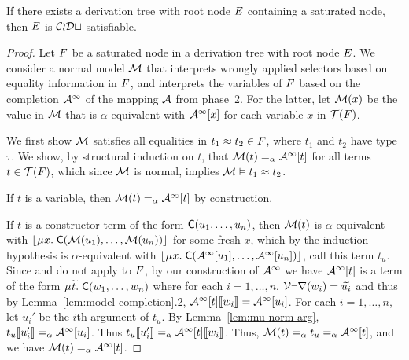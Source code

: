 \begin{theorem}%
\label{thm:ss}%
\afterDot
If there exists a derivation tree with root node $E$ containing a saturated node, then $E$ is $\mathcal{CoDt}$-satisfiable.
\end{theorem}
\begin{proof}
Let $F$ be a saturated node in a derivation tree with root node $E$.
We consider a normal model $\mathcal{M}$
that interprets wrongly applied selectors based on equality information in $F$,
and interprets the variables of $F$ based on the completion $\mathcal{A}^\infty$ of the mapping $\mathcal{A}$ from phase~2.
For the latter, let $\mathcal{M}( x )$ be the value in $\mathcal{M}$ that is $\alpha$-equivalent with $\mathcal{A}^\infty [x]$ for each variable $x$ in $\mathcal{T}(F)$.

We first show $\mathcal{M}$ satisfies all equalities in $t_1 \approx t_2 \in F$, where $t_1$ and $t_2$ have type $\tau$.
We show,
by structural induction on $t$,
that $\mathcal{M}( t ) \mathrel{=_\alpha} \mathcal{A}^\infty [t]$ for all terms $t \in \mathcal{T}( F )$,
which since $\mathcal{M}$ is normal, implies $\mathcal{M} \vDash t_1 \approx t_2$.

If $t$ is a variable, then $\mathcal{M}( t ) \mathrel{=_\alpha} \mathcal{A}^\infty [ t ]$ by construction.

If $t$ is a constructor term of the form $\textsf{C}( u_1, \ldots, u_n )$,
then $\mathcal{M}( t )$ is $\alpha$-equivalent with $\nf{\MU x.\; \const{C}( \M( u_1 ), \ldots, \M( u_n ) ) }$ for some fresh $x$,
which by the induction hypothesis is $\alpha$-equivalent with $\nf{\MU x.\; \const{C}( \Val^\AST \ec{ u_1 }, \ldots, \Val^\AST \ec{ u_n } )}$, call this term $t_u$.
Since  and  do not apply to $F$, 
by our construction of $\mathcal{A}^\infty$ we have $\mathcal{A}^\infty [t]$ is a term
of the form $\MU {\Varec{t}}.\; \const{C}( w_1, \ldots, w_n )$ 
where for each $i = 1, \ldots, n$, 
$\mathcal{Var}(w_i) = {\widetilde{u_i}}$ and thus by Lemma~\ref{lem:model-completion}.2, 
$\mathcal{A}^\infty [t]\llbracket w_i \rrbracket = \mathcal{A}^\infty [u_i]$.
For each $i = 1, \ldots, n$, let $u_i'$ be the $i$\vvthinspace th argument of $t_u$.
By Lemma~\ref{lem:mu-norm-arg}, $t_u\llbracket u_i' \rrbracket \mathrel{=_\alpha} \mathcal{A}^\infty [u_i]$.
Thus $t_u\llbracket u_i' \rrbracket \mathrel{=_\alpha} \mathcal{A}^\infty [t]\llbracket  w_i  \rrbracket$. %
Thus, $\mathcal{M}( t ) \mathrel{=_\alpha} t_u \mathrel{=_\alpha} \mathcal{A}^\infty [t]$, and
we have $\mathcal{M}( t ) \mathrel{=_\alpha} \mathcal{A}^\infty [t]$.


\end{proof}
